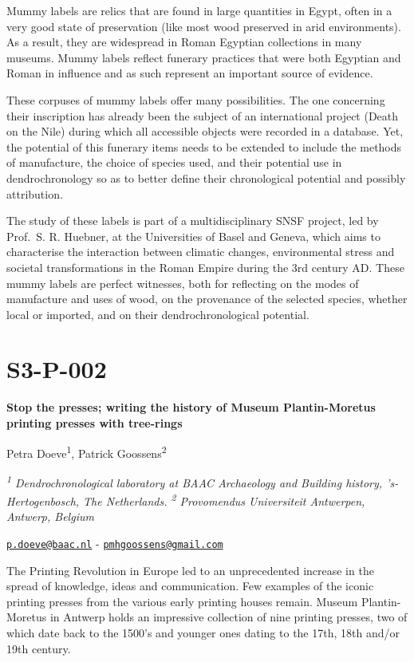 \documentclass[
]{book}
\begin{document}
Mummy labels are relics that are found in large quantities in Egypt, often in a very good state of preservation (like most wood preserved in arid environments). As a result, they are widespread in Roman Egyptian collections in many museums. Mummy labels reflect funerary practices that were both Egyptian and Roman in influence and as such represent an important source of evidence.

These corpuses of mummy labels offer many possibilities. The one concerning their inscription has already been the subject of an international project (Death on the Nile) during which all accessible objects were recorded in a database. Yet, the potential of this funerary items needs to be extended to include the methods of manufacture, the choice of species used, and their potential use in dendrochronology so as to better define their chronological potential and possibly attribution.

The study of these labels is part of a multidisciplinary SNSF project, led by Prof.~S. R. Huebner, at the Universities of Basel and Geneva, which aims to characterise the interaction between climatic changes, environmental stress and societal transformations in the Roman Empire during the 3rd century AD. These mummy labels are perfect witnesses, both for reflecting on the modes of manufacture and uses of wood, on the provenance of the selected species, whether local or imported, and on their dendrochronological potential.

\hypertarget{s3-p-002}{%
\section*{S3-P-002}\label{s3-p-002}}

\textbf{Stop the presses; writing the history of Museum Plantin-Moretus printing presses with tree-rings}

Petra Doeve\textsuperscript{1}, Patrick Goossens\textsuperscript{2}

\emph{\textsuperscript{1} Dendrochronological laboratory at BAAC Archaeology and Building history, 's-Hertogenbosch, The Netherlands. \textsuperscript{2} Provomendus Universiteit Antwerpen, Antwerp, Belgium}

\href{mailto:p.doeve@baac.nl}{\nolinkurl{p.doeve@baac.nl}} - \href{mailto:pmhgoossens@gmail.com}{\nolinkurl{pmhgoossens@gmail.com}}

The Printing Revolution in Europe led to an unprecedented increase in the spread of knowledge, ideas and communication. Few examples of the iconic printing presses from the various early printing houses remain. Museum Plantin-Moretus in Antwerp holds an impressive collection of nine printing presses, two of which date back to the 1500's and younger ones dating to the 17th, 18th and/or 19th century.
\end{document}
